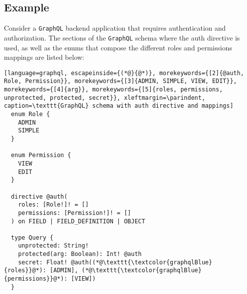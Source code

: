 \subsection{Example}
\label{subsec:corollary_projects_graphql_auth_diretive_example}

Consider a \texttt{GraphQL} backend application that requires authentication and
authorization. The sections of the \texttt{GraphQL} schema where the auth directive
is used, as well as the enums that compose the different roles and permissions
mappings are listed below:

\begin{lstlisting}[language=graphql, escapeinside={(*@}{@*)}, morekeywords={[2]{@auth, Role, Permission}}, morekeywords={[3]{ADMIN, SIMPLE, VIEW, EDIT}}, morekeywords={[4]{arg}}, morekeywords={[5]{roles, permissions, unprotected, protected, secret}}, xleftmargin=\parindent, caption=\texttt{GraphQL} schema with auth directive and mappings]
  enum Role {
    ADMIN
    SIMPLE
  }

  enum Permission {
    VIEW
    EDIT
  }

  directive @auth(
    roles: [Role!]! = []
    permissions: [Permission!]! = []
  ) on FIELD | FIELD_DEFINITION | OBJECT

  type Query {
    unprotected: String!
    protected(arg: Boolean): Int! @auth
    secret: Float! @auth((*@\texttt{\textcolor{graphqlBlue}{roles}}@*): [ADMIN], (*@\texttt{\textcolor{graphqlBlue}{permissions}}@*): [VIEW])
  }
\end{lstlisting}

